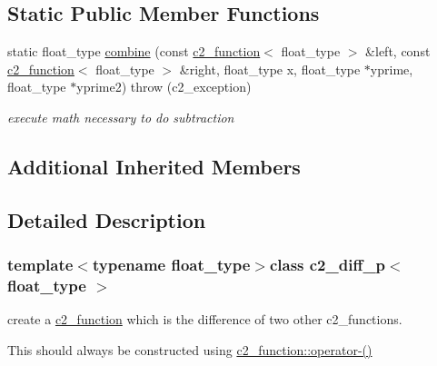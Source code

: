 \subsection*{Static Public Member Functions}
\begin{DoxyCompactItemize}
\item 
\hypertarget{classc2__diff__p_ae6481f9c5fa1c245fd7c2ef5df096399}{static float\-\_\-type \hyperlink{classc2__diff__p_ae6481f9c5fa1c245fd7c2ef5df096399}{combine} (const \hyperlink{classc2__function}{c2\-\_\-function}$<$ float\-\_\-type $>$ \&left, const \hyperlink{classc2__function}{c2\-\_\-function}$<$ float\-\_\-type $>$ \&right, float\-\_\-type x, float\-\_\-type $\ast$yprime, float\-\_\-type $\ast$yprime2)  throw (c2\-\_\-exception)}\label{classc2__diff__p_ae6481f9c5fa1c245fd7c2ef5df096399}

\begin{DoxyCompactList}\small\item\em execute math necessary to do subtraction \end{DoxyCompactList}\end{DoxyCompactItemize}
\subsection*{Additional Inherited Members}


\subsection{Detailed Description}
\subsubsection*{template$<$typename float\-\_\-type$>$class c2\-\_\-diff\-\_\-p$<$ float\-\_\-type $>$}

create a \hyperlink{classc2__function}{c2\-\_\-function} which is the difference of two other c2\-\_\-functions.

This should always be constructed using \hyperlink{classc2__function_a4c56a4673e00bfad37143c403a0c94c8}{c2\-\_\-function\-::operator-\/()} 

